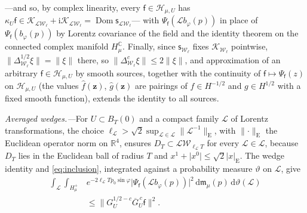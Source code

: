 \documentclass[aps,prl,reprint,longbibliography,raggedbottom]{revtex4-2}
\newcommand{\C}{\mathbb C}
\newcommand{\R}{\mathbb R}
\newcommand{\ii}{\mathrm i}
\newcommand{\dd}{\,\mathrm d}
\newcommand{\norm}[1]{\lVert #1\rVert}
\newcommand{\abs}[1]{\lvert #1\rvert}
\newcommand{\Hh}{\mathcal H}
\newcommand{\sx}{\mathsf f}
\newcommand{\bz}{\mathbf z}
\begin{document}
---and so, by complex linearity, every $\sx\in\Hh_{\mu,U}$ has
$\kappa_U\sx\in\mathcal K_{\mathcal L\mathcal W_\ell}
+\ii\mathcal K_{\mathcal L\mathcal W_\ell}
=\operatorname{Dom}\mathsf s_{\mathcal L\mathcal W_\ell}$---%
with $\Psi_\sx(\mathcal Lb_\varphi(p))$ in place of $\Psi_\sx(b_\varphi(p))$
by Lorentz covariance of the field and the identity theorem on the
connected complex manifold $H_\mu^{\C}$. Finally, since
$\mathsf s_{\mathcal W_\ell}$ fixes $\mathcal K_{\mathcal W_\ell}$
pointwise,
$\norm{\Delta_{\mathcal W_\ell}^{1/2}\xi}=\norm\xi$ there, so
$\norm{\Delta^c_{\mathcal W_\ell}\xi}\le2\norm\xi$, and approximation
of an arbitrary $\sx\in\Hh_{\mu,U}$ by smooth sources, together with the
continuity of $\sx\mapsto\Psi_\sx(z)$ on $\Hh_{\mu,U}$ (the values
$\hat f(\bz)$, $\hat g(\bz)$ are pairings of $f\in H^{-1/2}$ and
$g\in H^{1/2}$ with a fixed smooth function), extends the identity to
all sources.

\emph{Averaged wedges.---}For $U\subset B_T(0)$ and a compact family
$\mathscr L$ of Lorentz transformations, the choice
$\ell_{\mathscr L}>\sqrt2\sup_{\mathcal L\in\mathscr L}\norm{\mathcal L^{-1}}_{\mathrm E}$,
with $\norm\cdot_{\mathrm E}$ the Euclidean operator norm on $\R^4$,
ensures $D_T\subset\mathcal L\mathcal W_{\ell_{\mathscr L}T}$ for every
$\mathcal L\in\mathscr L$, because $D_T$ lies in the Euclidean ball of
radius $T$ and $x^1+\abs{x^0}\le\sqrt2\abs x_{\mathrm E}$. The wedge
identity and \eqref{eq:inclusion}, integrated against a probability
measure $\vartheta$ on $\mathscr L$, give
\begin{equation}
\begin{split}
\int_{\mathscr L}\int_{H_\mu^+}&e^{-2\ell_{\mathscr L}Tp_0\sin\varphi}
\abs{\Psi_\sx(\mathcal Lb_\varphi(p))}^2\dd\mathfrak m_\mu(p)\dd\vartheta(\mathcal L)\\
&\le\norm{G_U^{1/2-c}\overline G_U^{\,c}\sx}^2 .
\end{split}
\label{eq:averaged-wedges}
\end{equation}
\end{document}
